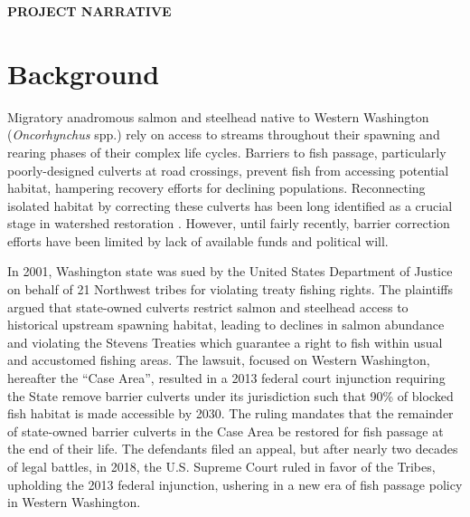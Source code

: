 \renewcommand\thesection{\Alph{section}}

\begin{center} \textbf{PROJECT NARRATIVE} \end{center}

\section{Background}


Migratory anadromous salmon and steelhead native to Western Washington (\textit{Oncorhynchus} spp.) rely on access to streams throughout their spawning and rearing phases of their complex life cycles. Barriers to fish passage, particularly poorly-designed culverts at road crossings, prevent fish from accessing potential habitat, hampering recovery efforts for declining populations. Reconnecting isolated habitat by correcting these culverts has been long identified as a crucial stage in watershed restoration \citep{roni_review_2002}. However, until fairly recently, barrier correction efforts have been limited by lack of available funds and political will. 

In 2001, Washington state was sued by the United States Department of Justice on behalf of 21 Northwest tribes for violating treaty fishing rights. The plaintiffs argued that state-owned culverts restrict salmon and steelhead access to historical upstream spawning habitat, leading to declines in salmon abundance and violating the Stevens Treaties which guarantee a right to fish within usual and accustomed fishing areas. The lawsuit, focused on Western Washington, hereafter the ``Case Area'', resulted in a 2013 federal court injunction requiring the State remove barrier culverts under its jurisdiction such that 90\% of blocked fish habitat is made accessible by 2030. The ruling mandates that the remainder of state-owned barrier culverts in the Case Area be restored for fish passage at the end of their life. The defendants filed an appeal, but after nearly two decades of legal battles, in 2018, the U.S. Supreme Court ruled in favor of the Tribes, upholding the 2013 federal injunction, ushering in a new era of fish passage policy in Western Washington. 


